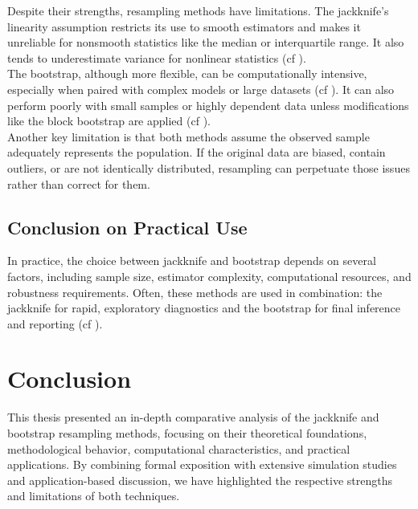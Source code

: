\documentclass[aodsor,preprint]{imsart}
\numberwithin{equation}{section}
\theoremstyle{plain}
\begin{document}
Despite their strengths, resampling methods have limitations. The jackknife's linearity assumption restricts its use to smooth estimators and makes it unreliable for nonsmooth statistics like the median or interquartile range. It also tends to underestimate variance for nonlinear statistics (cf \cite{shao1995jackknife,davison1997bootstrap}). \\

The bootstrap, although more flexible, can be computationally intensive, especially when paired with complex models or large datasets (cf \cite{efron1993introduction,davison1997bootstrap}). It can also perform poorly with small samples or highly dependent data unless modifications like the block bootstrap are applied (cf \cite{davison1997bootstrap}). \\

Another key limitation is that both methods assume the observed sample adequately represents the population. If the original data are biased, contain outliers, or are not identically distributed, resampling can perpetuate those issues rather than correct for them. \\

\subsection{Conclusion on Practical Use}

In practice, the choice between jackknife and bootstrap depends on several factors, including sample size, estimator complexity, computational resources, and robustness requirements. Often, these methods are used in combination: the jackknife for rapid, exploratory diagnostics and the bootstrap for final inference and reporting (cf \cite{efron1993introduction,shao1995jackknife,davison1997bootstrap}). \\

\section{Conclusion}

This thesis presented an in-depth comparative analysis of the jackknife and bootstrap resampling methods, focusing on their theoretical foundations, methodological behavior, computational characteristics, and practical applications. By combining formal exposition with extensive simulation studies and application-based discussion, we have highlighted the respective strengths and limitations of both techniques. \\
\end{document}
